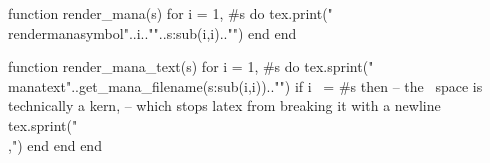 \begin{luacode*}
    function render_mana(s)
        for i = 1, #s do
            tex.print("\\rendermanasymbol{"..i.."}{"..s:sub(i,i).."}")
        end
    end
\end{luacode*}
\newcommand{\rendermana}[1]{\directlua{render_mana(\luastring{#1})}}


\newcommand{\manatext}[1]{%
    \smash{\scalerel*{\texttt{[image: icons/mana/\#1.png]}}{\strut}}%
}
\begin{luacode*}
    function render_mana_text(s)
        for i = 1, #s do
            tex.sprint("\\manatext{"..get_mana_filename(s:sub(i,i)).."}")
            if i ~= #s then 
                -- the \, space is technically a kern, 
                -- which stops latex from breaking it with a newline
                tex.sprint("\\,")
            end
        end
    end
\end{luacode*}
\newcommand{\mana}[1]{\directlua{render_mana_text(\luastring{#1})}}








